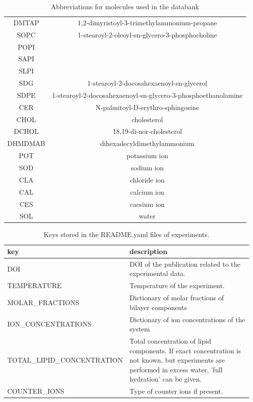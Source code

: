 \documentclass[fleqn,10pt]{wlscirep}
\begin{document}
\begin{table}[h]
\begin{tabular}{c c}
DMTAP & 1,2-dimyristoyl-3-trimethylammonium-propane \\
SOPC & 1-stearoyl-2-oleoyl-sn-glycero-3-phosphocholine \\
POPI & \\ 
SAPI & \\
SLPI &  \\
SDG & 1-stearoyl-2-docosahexaenoyl-sn-glycerol \\
SDPE & 1-stearoyl-2-docosahexaenoyl-sn-glycero-3-phosphoethanolamine \\
CER  & N-palmitoyl-D-erythro-sphingosine \\
CHOL & cholesterol  \\
DCHOL & 18,19-di-nor-cholesterol \\
DHMDMAB & dihexadecyldimethylammonium  \\
\hline
POT & potassium ion  \\
SOD & sodium ion  \\
CLA & chloride ion \\
CAL & calcium ion  \\
CES & caesium ion \\
SOL & water  \\
    \end{tabular}
    \caption{Abbreviations for molecules used in the databank}
    \label{tab:abbreviations}
\end{table}



\begin{table}[]
    \centering
    \begin{tabular}{  p{5.0cm}  p{10.0cm}}
    \toprule
    key & description \\
    \midrule
    DOI & DOI of the publication related to the experimental data. \\
    TEMPERATURE & Temperature of the experiment. \\
    MOLAR\_FRACTIONS & Dictionary of molar fractions of bilayer components \\
    ION\_CONCENTRATIONS & Dictionary of ion concentrations of the system \\%
    TOTAL\_LIPID\_CONCENTRATION & Total concentration of lipid components. If exact concentration is not known, but experiments are performed in excess water, 'full hydration' can be given. \\
    COUNTER\_IONS & Type of counter ions if present.
\end{tabular}
    \caption{Keys stored in the README.yaml files of experiments.}
    \label{tab:READMEkeysEXP}
\end{table}
\end{document}
